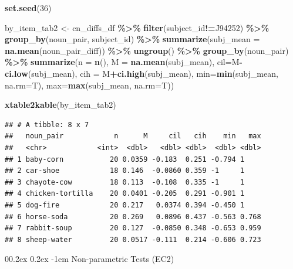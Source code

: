 \documentclass[
  doc,floatsintext]{apa6}
\makeatletter
\newenvironment{Shaded}{\begin{snugshade}}{\end{snugshade}}
\newcommand{\AttributeTok}[1]{\textcolor[rgb]{0.13,0.29,0.53}{#1}}
\newcommand{\DecValTok}[1]{\textcolor[rgb]{0.00,0.00,0.81}{#1}}
\newcommand{\FunctionTok}[1]{\textcolor[rgb]{0.13,0.29,0.53}{\textbf{#1}}}
\newcommand{\NormalTok}[1]{#1}
\newcommand{\OtherTok}[1]{\textcolor[rgb]{0.56,0.35,0.01}{#1}}
\newcommand{\SpecialCharTok}[1]{\textcolor[rgb]{0.81,0.36,0.00}{\textbf{#1}}}
\newcommand{\StringTok}[1]{\textcolor[rgb]{0.31,0.60,0.02}{#1}}
\let\oldparagraph\paragraph
\renewcommand{\paragraph}{
    \@ifstar
      \xxxParagraphStar
      \xxxParagraphNoStar
  }
\newcommand{\xxxParagraphStar}[1]{\oldparagraph*{#1}\mbox{}}
\newcommand{\xxxParagraphNoStar}[1]{\oldparagraph{#1}\mbox{}}
\renewcommand{\paragraph}{\@startsection{paragraph}{4}{\parindent}%
  {0\baselineskip \@plus 0.2ex \@minus 0.2ex}%
  {-1em}%
  {\normalfont\normalsize\bfseries\itshape\typesectitle}}
\makeatother
\begin{document}
\begin{Shaded}
\begin{Highlighting}[]
\FunctionTok{set.seed}\NormalTok{(}\DecValTok{36}\NormalTok{)}

\NormalTok{by\_item\_tab2 }\OtherTok{\textless{}{-}}\NormalTok{ cn\_diffs\_df }\SpecialCharTok{\%\textgreater{}\%}
  \FunctionTok{filter}\NormalTok{(subject\_id}\SpecialCharTok{!=}\StringTok{\textquotesingle{}J94252\textquotesingle{}}\NormalTok{) }\SpecialCharTok{\%\textgreater{}\%}
  \FunctionTok{group\_by}\NormalTok{(noun\_pair, subject\_id) }\SpecialCharTok{\%\textgreater{}\%}
  \FunctionTok{summarize}\NormalTok{(}\AttributeTok{subj\_mean =} \FunctionTok{na.mean}\NormalTok{(noun\_pair\_diff)) }\SpecialCharTok{\%\textgreater{}\%}
  \FunctionTok{ungroup}\NormalTok{() }\SpecialCharTok{\%\textgreater{}\%}
  \FunctionTok{group\_by}\NormalTok{(noun\_pair) }\SpecialCharTok{\%\textgreater{}\%}
  \FunctionTok{summarize}\NormalTok{(}\AttributeTok{n =} \FunctionTok{n}\NormalTok{(),}
            \AttributeTok{M =} \FunctionTok{na.mean}\NormalTok{(subj\_mean),}
            \AttributeTok{cil=}\NormalTok{M}\SpecialCharTok{{-}}\FunctionTok{ci.low}\NormalTok{(subj\_mean),}
            \AttributeTok{cih =}\NormalTok{ M}\SpecialCharTok{+}\FunctionTok{ci.high}\NormalTok{(subj\_mean),}
            \AttributeTok{min=}\FunctionTok{min}\NormalTok{(subj\_mean, }\AttributeTok{na.rm=}\NormalTok{T),}
            \AttributeTok{max=}\FunctionTok{max}\NormalTok{(subj\_mean, }\AttributeTok{na.rm=}\NormalTok{T))}

\FunctionTok{xtable2kable}\NormalTok{(by\_item\_tab2)}
\end{Highlighting}
\end{Shaded}

\begin{verbatim}
## # A tibble: 8 x 7
##   noun_pair            n      M     cil   cih    min   max
##   <chr>            <int>  <dbl>   <dbl> <dbl>  <dbl> <dbl>
## 1 baby-corn           20 0.0359 -0.183  0.251 -0.794 1    
## 2 car-shoe            18 0.146  -0.0860 0.359 -1     1    
## 3 chayote-cow         18 0.113  -0.108  0.335 -1     1    
## 4 chicken-tortilla    20 0.0401 -0.205  0.291 -0.901 1    
## 5 dog-fire            20 0.217   0.0374 0.394 -0.450 1    
## 6 horse-soda          20 0.269   0.0896 0.437 -0.563 0.768
## 7 rabbit-soup         20 0.127  -0.0850 0.348 -0.653 0.959
## 8 sheep-water         20 0.0517 -0.111  0.214 -0.606 0.723
\end{verbatim}

\paragraph{Non-parametric Tests (EC2)}\label{non-parametric-tests-ec2}
\end{document}
